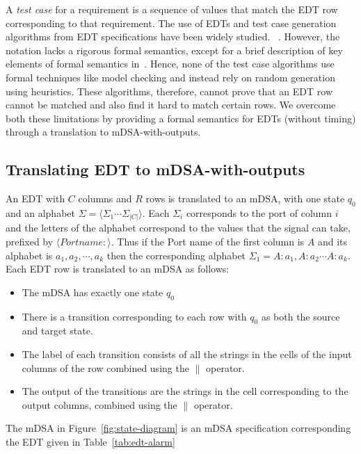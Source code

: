 A \emph{test case} for a requirement is a sequence of values  that match the
EDT row corresponding to that requirement. The use of EDTs and test case generation
algorithms from EDT specifications have been widely studied.
~\cite{DBLP:conf/enase/VenkateshSZA15a,DBLP:conf/icst/AgrawalVSZV20}. However, the notation lacks a rigorous
formal semantics, except for a brief description of key elements of formal
semantics in~\cite{DBLP:conf/date/VenkateshSKA14}. Hence, none of the test case algorithms use
formal techniques like model checking and instead rely on random generation
using heuristics. These algorithms, therefore, cannot prove that an EDT row
cannot be matched and also find it hard to match certain rows. We overcome both
these limitations by providing a formal semantics for EDTs (without timing)
through a translation to mDSA-with-outputs.


\subsection{Translating EDT to mDSA-with-outputs}

An EDT with $C$ columns and $R$ rows is translated to an mDSA, with one
state $q_0$ and an alphabet $\Sigma = \langle \Sigma_1 \cdots \Sigma_{|C|} \rangle$.
Each $\Sigma_i$ corresponds to the port of column $i$ and the
letters of the alphabet correspond to the values that the signal can take,
prefixed by $\langle Portname: \rangle$. 
Thus if the Port name of the first
column is $A$ and its alphabet is ${ a_1, a_2, \cdots, a_k}$ then the
corresponding alphabet $\Sigma_1 = {A:a_1, A:a_2 \cdots A:a_k}$. 
Each EDT row is translated to an mDSA as follows:
\begin{itemize}
\item The mDSA has exactly one state $q_0$

\item
There is a transition corresponding to each row with $q_0$ as both the source and target state. 
\item
The label of each transition consists of all the strings in the cells of the input columns of the row combined using the $\parallel$ operator.
\item 
The output of the transitions are the strings in the cell corresponding to the output columns, combined using the $\parallel$ operator.
\end{itemize}

The mDSA in Figure~\ref{fig:state-diagram} is an mDSA specification corresponding the EDT given in Table~\ref{tab:edt-alarm}

